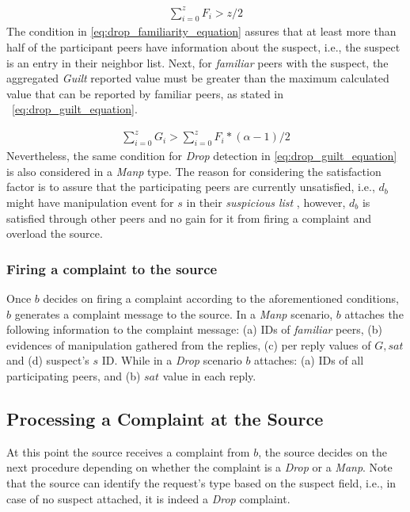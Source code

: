 \begin{align}
\label{eq:drop_familiarity_equation}
\sum_{i=0}^{z} F_i > z/2
\end{align}
The condition in \ref{eq:drop_familiarity_equation} assures that at least more than half of the participant peers have information about the suspect, i.e., the suspect is an entry in their neighbor list.
Next, for \textit{familiar} peers with the suspect, the aggregated \textit{Guilt} reported value must be greater than the maximum calculated value that can be reported by familiar peers, as stated in ~\ref{eq:drop_guilt_equation}.

\begin{align}
\label{eq:drop_guilt_equation}
\sum_{i=0}^{z} G_i > \sum_{i=0}^{z} F_i*(\alpha-1)/2
\end{align}
Nevertheless, the same condition for \textit{Drop} detection in \ref{eq:drop_guilt_equation} is also considered in a \textit{Manp} type.
The reason for considering the satisfaction factor is to assure that the participating peers are currently unsatisfied, i.e., $d_b$ might have manipulation event for $s$ in their \textit{suspicious list} , however, $d_b$ is satisfied through other peers and no gain for it from firing a complaint and overload the source.

\subsubsection*{Firing a complaint to the source}

Once $b$ decides on firing a complaint according to the aforementioned conditions, $b$ generates a complaint message to the source.
In a \textit{Manp} scenario, $b$ attaches the following information to the complaint message: (a) IDs of \textit{familiar} peers, (b) evidences of manipulation gathered from the replies, (c) per reply values of $G,sat$ and (d) suspect's $s$ ID.
While in a \textit{Drop} scenario $b$ attaches: (a) IDs of all participating peers, and (b) $sat$ value in each reply.

\subsection{Processing a Complaint at the Source}
\label{complaint_source}
At this point the source receives a complaint from $b$, the source decides on the next procedure depending on whether the complaint is a \textit{Drop} or a \textit{Manp}.
Note that the source can identify the request's type based on the suspect field, i.e., in case of no suspect attached, it is indeed a \textit{Drop} complaint.

